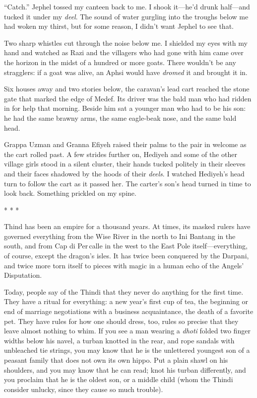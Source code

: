 ``Catch.''  Jephel tossed my canteen back to me.  I shook it---he'd
drunk half---and tucked it under my \emph{deel}.  The sound of water
gurgling into the troughs below me had woken my thirst, but for some
reason, I didn't want Jephel to see that.

Two sharp whistles cut through the noise below me.  I shielded my eyes
with my hand and watched as Razi and the villagers who had gone with
him came over the horizon in the midst of a hundred or more goats.
There wouldn't be any stragglers: if a goat was alive, an Aphsi would
have \emph{dromed} it and brought it in.

Six houses away and two stories below, the caravan's lead cart reached
the stone gate that marked the edge of Medef.  Its driver was the bald
man who had ridden in for help that morning.  Beside him sat a younger
man who had to be his son: he had the same brawny arms, the same
eagle-beak nose, and the same bald head.

Grappa Uzman and Granna Efiyeh raised their palms to the pair in
welcome as the cart rolled past.  A few strides further on, Hediyeh
and some of the other village girls stood in a silent cluster, their
hands tucked politely in their sleeves and their faces shadowed by the
hoods of their \emph{deels}.  I watched Hediyeh's head turn to follow the
cart as it passed her.  The carter's son's head turned in time to look
back.  Something prickled on my spine.

\begin{center}* * *\end{center}

Thind has been an empire for a thousand years.  At times, its masked
rulers have governed everything from the Wise River in the north to
Ini Bantang in the south, and from Cap di Per\,calle in the west to
the East Pole itself---everything, of course, except the dragon's
isles.  It has twice been conquered by the Darpani, and twice more
torn itself to pieces with magic in a human echo of the Angels'
Disputation.

Today, people say of the Thindi that they never do anything for the
first time.  They have a ritual for everything: a new year's first cup
of tea, the beginning or end of marriage negotiations with a business
acquaintance, the death of a favorite pet.  They have rules for how
one should dress, too, rules so precise that they leave almost nothing
to whim.  If you see a man wearing a \emph{dhoti} folded two finger widths
below his navel, a turban knotted in the rear, and rope sandals with
unbleached tie strings, you may know that he is the unlettered
youngest son of a peasant family that does not own its own hippo.  Put
a plain shawl on his shoulders, and you may know that he can read;
knot his turban differently, and you proclaim that he is the oldest
son, or a middle child (whom the Thindi consider unlucky, since they
cause so much trouble).

